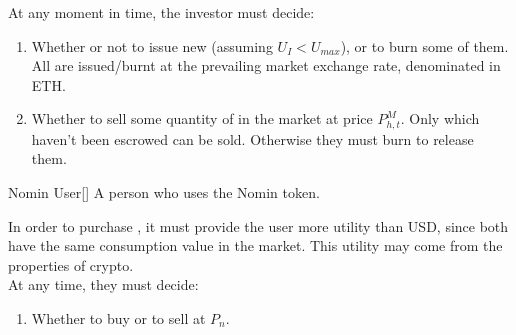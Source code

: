\noindent At any moment in time, the investor must decide:
\begin{enumerate}
\item{Whether or not to issue new \NOM{} (assuming $U_I < U_{max}$), or to burn some of them. All \NOM{} are issued/burnt at the prevailing market exchange rate, denominated in ETH.}
\item{Whether to sell some quantity of \HAV{} in the market at price $P^M_{h,t}$. Only \HAV{} which haven't been escrowed can be sold. Otherwise they must burn \NOM{} to release them. }
\end{enumerate}

\begin{namedthm}{Nomin User}[]
A person who uses the Nomin token.
\end{namedthm}
 
\noindent In order to purchase \NOM{}, it must provide the user more utility than USD, since both have the same consumption value in the market. This utility may come from the properties of crypto. \\

\noindent At any time, they must decide: 
\begin{enumerate}
\item{Whether to buy or to sell \NOM{} at $P_n$.}
\end{enumerate}

\newpage